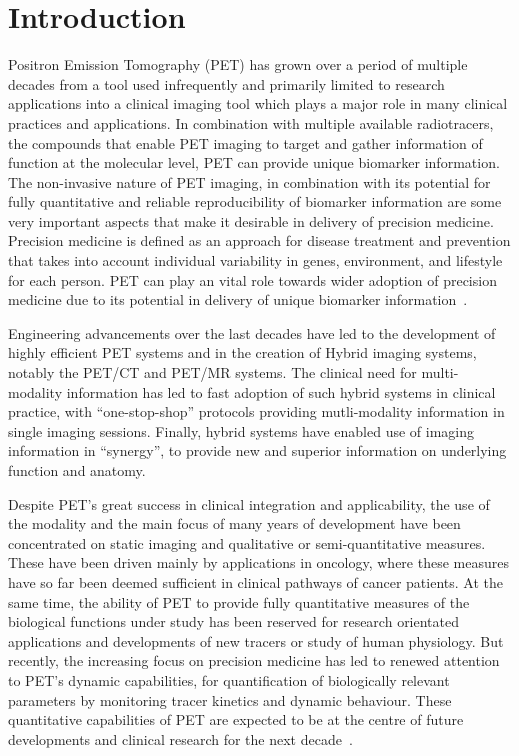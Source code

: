 \chapter{Introduction}
Positron Emission Tomography (PET) has grown over a period of multiple decades from a tool used infrequently and primarily limited to research applications into a clinical imaging tool which plays a major role in many clinical practices and applications. 
In combination with multiple available radiotracers, the compounds that enable PET imaging to target and gather information of function at the molecular level, PET can provide unique biomarker information. The non-invasive nature of PET imaging, in combination with its potential for fully quantitative and reliable reproducibility of biomarker information are some very important aspects that make it desirable in delivery of precision medicine. Precision medicine is defined as an approach for disease treatment and prevention that takes into account individual variability in genes, environment, and lifestyle for each person. PET can play an vital role towards wider adoption of precision medicine due to its potential in delivery of unique biomarker information~\cite{Subramaniam2017}.

Engineering advancements over the last decades have led to the development of highly efficient PET systems and in the creation of Hybrid imaging systems, notably the PET/CT and PET/MR systems. The clinical need for multi-modality information has led to fast adoption of such hybrid systems in clinical practice, with “one-stop-shop” protocols providing mutli-modality information in single imaging sessions. Finally, hybrid systems have enabled use of imaging information in “synergy”, to provide new and superior information on underlying function and anatomy. 

Despite PET’s great success in clinical integration and applicability, the use of the modality and the main focus of many years of development have been concentrated on static imaging and qualitative or semi-quantitative measures. These have been driven mainly by applications in oncology, where these measures have so far been deemed sufficient in clinical pathways of cancer patients. At the same time, the ability of PET to provide fully quantitative measures of the biological functions under study has been reserved for research orientated applications and developments of new tracers or study of human physiology. 
But recently, the increasing focus on precision medicine has led to renewed attention to PET’s dynamic capabilities, for quantification of biologically relevant parameters by monitoring tracer kinetics and dynamic behaviour. These quantitative capabilities of PET are expected to be at the centre of future developments and clinical research for the next decade~\cite{Lammertsma2017,Meikle2021}.

